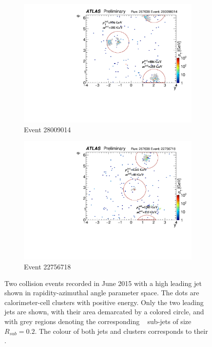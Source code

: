 \begin{figure}[htbp!]
  \centering
  \captionsetup{justification=centering}
  \hspace{-3cm}
    \begin{subfigure}[b]{0.35\textwidth}
        \includegraphics[width=\textwidth,angle=-90]{figures/object/Jet_evt_a.pdf}
        \caption{Event 28009014}
        \label{fig:obj_jet_evt_a}
    \end{subfigure}
    \quad \quad \quad \quad
    \begin{subfigure}[b]{0.35\textwidth}
        \includegraphics[width=\textwidth,angle=-90]{figures/object/Jet_evt_b.pdf}
        \caption{Event 22756718}
        \label{fig:obj_jet_evt_b}
    \end{subfigure}
   \caption{
   Two collision events recorded in June 2015 with a high leading jet \pt shown in rapidity-azimuthal angle parameter space. 
   The dots are calorimeter-cell clusters with positive energy. 
   Only the two leading jets are shown, with their area demarcated by a colored circle, and with grey regions denoting the corresponding \kt~ sub-jets of size $R_{sub}=0.2$. 
   The colour of both jets and clusters corresponds to their \pt.}
  \label{fig:obj_jet_evt}
\end{figure}


